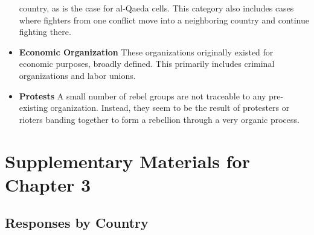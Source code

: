 \documentclass[12pt,]{book}
\theoremstyle{definition}
\theoremstyle{definition}
\theoremstyle{definition}
\theoremstyle{remark}
\begin{document}
\begin{itemize}
  country, as is the case for al-Qaeda cells. This category also
  includes cases where fighters from one conflict move into a
  neighboring country and continue fighting there.
\item
  \textbf{Economic Organization} These organizations originally existed
  for economic purposes, broadly defined. This primarily includes
  criminal organizations and labor unions.
\item
  \textbf{Protests} A small number of rebel groups are not traceable to
  any pre-existing organization. Instead, they seem to be the result of
  protesters or rioters banding together to form a rebellion through a
  very organic process.
\end{itemize}

\hypertarget{supplementary-materials-for-chapter-3}{%
\section*{Supplementary Materials for Chapter
3}\label{supplementary-materials-for-chapter-3}}

\pagebreak

\hypertarget{responses-by-country}{%
\subsection*{Responses by Country}\label{responses-by-country}}

\singlespacing
\end{document}
